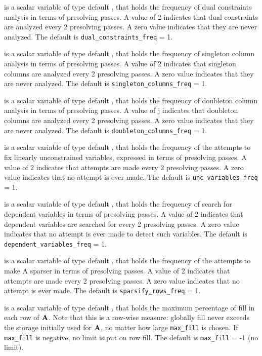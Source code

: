 \documentclass{galahad}
\begin{document}
\begin{description}
 is a scalar variable of type default \integer,
that holds the frequency of dual constraints analysis in terms of
presolving passes.  A value of 2 indicates that dual
constraints are analyzed every 2 presolving passes.  A zero
value indicates that they are never analyzed.
The default is {\tt dual\_constraints\_freq} = 1.

 is a scalar variable of type default \integer,
that holds the frequency of singleton column analysis in terms of
presolving passes.  A value of 2 indicates that 
singleton columns are analyzed every 2 presolving passes.  
A zero value indicates that they are never analyzed.
The default is {\tt singleton\_columns\_freq} = 1.

 is a scalar variable of type default \integer,
that holds the frequency of doubleton column analysis in terms of
presolving passes.  A value of j indicates that doubleton
columns are analyzed every 2 presolving passes.  A zero
value indicates that they are never analyzed.
The default is {\tt doubleton\_columns\_freq} = 1.

 is a scalar variable of type default \integer,
that holds the frequency of the attempts to fix linearly unconstrained
variables, expressed in terms of presolving passes.  A
value of 2 indicates that attempts are made every 2
presolving passes.  A zero value indicates that no attempt is ever made.
The default is {\tt unc\_variables\_freq} = 1.

 is a scalar variable of type default
\integer, that holds the frequency of search for dependent variables in terms
of  presolving passes.  A value of 2 indicates that 
dependent variables are searched for every 2 presolving 
passes.  A zero value indicates that no attempt is ever made to detect such
variables. The default is {\tt dependent\_variables\_freq} = 1.

 is a scalar variable of type default \integer,
that holds the frequency of the attempts to make A sparser in terms of
presolving passes.  A value of 2 indicates that attempts
are made every 2 presolving passes.  A zero value indicates
that no attempt is ever made.
The default is {\tt sparsify\_rows\_freq} = 1.

 is a scalar variable of type default \integer, that holds
the maximum percentage of fill in each row of ${\mathbf{A}}$. Note that
this is a row-wise measure: globally fill never exceeds
the storage initially used for ${\mathbf{A}}$, no matter how large 
{\tt max\_fill} is chosen. If {\tt max\_fill} is negative,
no limit is put on row fill.
The default is {\tt max\_fill} = -1 (no limit).


\end{description}
\end{document}

